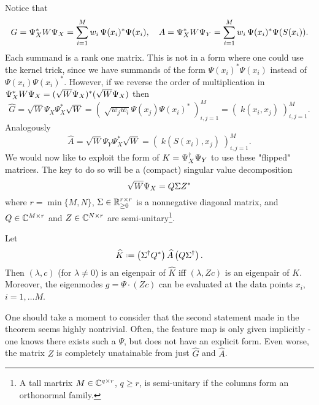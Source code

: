Notice that 
\begin{equation}
    G = \Psi_X^* W \Psi_X = \sum_{i=1}^{M} w_i\, \Psi (x_i)^* \Psi (x_i), \quad
    A = \Psi_X^* W \Psi_Y = \sum_{i=1}^{M} w_i\, \Psi (x_i)^* \Psi (S(x_i)) . 
\end{equation}
Each summand is a rank one matrix. 
This is not in a form where one could use the kernel trick, since we have summands of the 
form $\Psi (x_i)^* \Psi (x_i)$ instead of $\Psi (x_i) \Psi (x_i)^*$. However, if we 
reverse the order of multiplication in $\Psi_X^* W \Psi_X = (\sqrt{W} \Psi_X)^* (\sqrt{W} \Psi_X)$ 
then 
\begin{equation}
    \label{eq:G_hat}
    \widehat{G} = \sqrt{W} \Psi_X \Psi_X^* \sqrt{W}
    = \left(\; \sqrt{w_j w_i} \Psi (x_j) \Psi (x_i)^* \;\right)_{i, j=1}^M
    = \left(\; k(x_i, x_j) \;\right)_{i, j=1}^M . 
\end{equation}
Analogously 
\begin{equation}
    \label{eq:A_hat}
    \widehat{A} = \sqrt{W} \Psi_Y \Psi_X^* \sqrt{W}
    = \left(\; k(S(x_i), x_j) \;\right)_{i, j=1}^M . 
\end{equation}
We would now like to exploit the form of $K = \Psi_X^\dagger \Psi_Y$ 
to use these "flipped" matrices. The key to do so will be a (compact) singular value 
decomposition
\begin{equation}
    \label{eq:psi_x_svd}
    \sqrt{W} \Psi_X = Q \Sigma Z^*
\end{equation}
where $r = \min\{M, N\}$, $\Sigma \in \mathbb{R}_{\geq 0}^{r \times r}$ is a nonnegative diagonal 
matrix, and $Q \in \mathbb{C}^{M \times r}$ and $Z \in \mathbb{C}^{N \times r}$ are semi-unitary\footnote{
    A tall martrix $M \in \mathbb{C}^{q \times r}$, $q \geq r$, is semi-unitary if the columns 
    form an orthonormal family. 
}. 
\begin{theorem}
    \label{thm:K_hat}
    Let 
    \begin{equation}
        \label{eq:K_hat}
        \widehat{K} \defeq 
        \left( \Sigma^\dagger Q^* \right) \widehat{A} \left( Q \Sigma^\dagger \right) . 
    \end{equation}
    Then $(\lambda, c)$ (for $\lambda \neq 0$) is an eigenpair of $\widehat{K}$ iff 
    $(\lambda, Z c)$ is an eigenpair of $K$. Moreover, the eigenmodes 
    $g = \Psi \cdot (Z c)$ can be evaluated at the data points $x_i$, $i = 1, \ldots M$. 
\end{theorem}

One should take a moment to consider that the second statement made in the theorem
seems highly nontrivial. Often, the feature map is only given implicitly - one knows 
there exists such a $\Psi$, but does not have an explicit form. Even worse, the matrix 
$Z$ is completely unatainable from just $\widehat{G}$ and $\widehat{A}$. 

